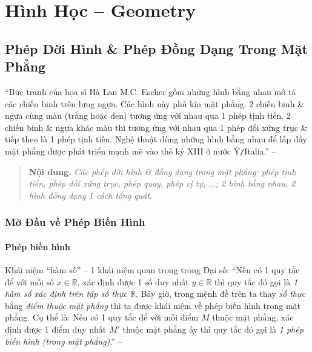 \documentclass[oneside]{book}
\numberwithin{equation}{section}
\begin{document}

\part{Hình Học -- Geometry}

\chapter{Phép Dời Hình \& Phép Đồng Dạng Trong Mặt Phẳng}

``Bức tranh của họa sĩ Hà Lan M.C. Escher gồm những hình bằng nhau mô tả các chiến binh trên lưng ngựa. Các hình này phủ kín mặt phẳng. 2 chiến binh \& ngựa cùng màu (trắng hoặc đen) tương ứng với nhau qua 1 phép tịnh tiến. 2 chiến binh \& ngựa khác màu thì tương ứng với nhau qua 1 phép đối xứng trục \& tiếp theo là 1 phép tịnh tiến. Nghệ thuật dùng những hình bằng nhau để lấp đầy mặt phẳng được phát triển mạnh mẽ vào thế kỷ XIII ở nước Ý\texttt{/}Italia.'' -- \cite[p. 3]{SGK_Toan_11_hinh_hoc_nang_cao}

\begin{quotation}
	\textbf{Nội dung.} \textit{Các phép dời hình \& đồng dạng trong mặt phẳng: phép tịnh tiến, phép đối xứng trục, phép quay, phép vị tự, $\ldots$; 2 hình bằng nhau, 2 hình đồng dạng 1 cách tổng quát}.
\end{quotation}

\section{Mở Đầu về Phép Biến Hình}

\subsection{Phép biến hình}
Khái niệm ``hàm số'' -- 1 khái niệm quan trọng trong Đại số: ``Nếu có 1 quy tắc để với mỗi số $x\in\mathbb{R}$, xác định được 1 số duy nhất $y\in\mathbb{R}$ thì quy tắc đó gọi là \textit{1 hàm số xác định trên tập số thực $\mathbb{R}$}. Bây giờ, trong mệnh đề trên ta thay \textit{số thực} bằng \textit{điểm thuộc mặt phẳng} thì ta được khái niệm về phép biến hình trong mặt phẳng. Cụ thể là: Nếu có 1 quy tắc để với mỗi điểm $M$ thuộc mặt phẳng, xác định được 1 điểm duy nhất $M'$ thuộc mặt phẳng ấy thì quy tắc đó gọi là \textit{1 phép biến hình (trong mặt phẳng)}.'' -- \cite[p. 4]{SGK_Toan_11_hinh_hoc_nang_cao}
\end{document}

